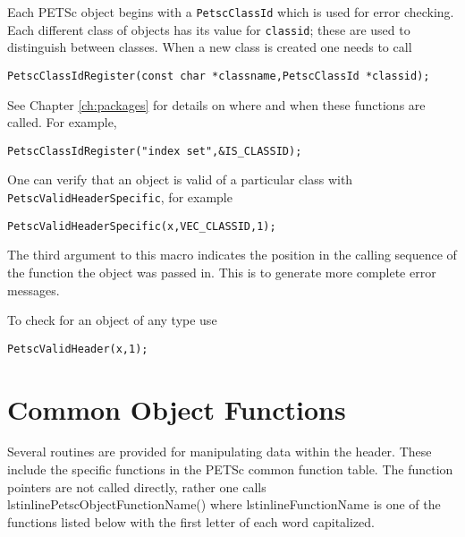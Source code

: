 Each PETSc object begins with a \lstinline{PetscClassId} which is used for error checking.
Each different class of objects has its value for \lstinline{classid}; these are used
to distinguish between classes. When a new class is created one needs to call
\begin{lstlisting}
PetscClassIdRegister(const char *classname,PetscClassId *classid);
\end{lstlisting}
See Chapter \ref{ch:packages} for details on where and when these functions are called. For example,
\begin{lstlisting}
PetscClassIdRegister("index set",&IS_CLASSID);
\end{lstlisting}
One can verify that an object is valid of a particular class with \lstinline{PetscValidHeaderSpecific}, for example
\begin{lstlisting}
PetscValidHeaderSpecific(x,VEC_CLASSID,1);
\end{lstlisting}
The third argument to this macro indicates the position in the calling sequence of the
function the object was passed in. This is to generate more complete error messages.

To check for an object of any type use
\begin{lstlisting}
PetscValidHeader(x,1);
\end{lstlisting}

\section{Common Object Functions}

Several routines are provided for manipulating data within the header.
These include the specific functions in the PETSc common function
table. The function pointers are not called directly, rather one calls
lstinline{PetscObjectFunctionName()} where lstinline{FunctionName} is
one of the functions listed below with the first letter of each word
capitalized.

